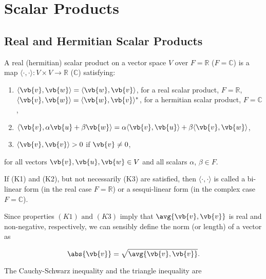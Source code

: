 \documentclass[a4paper,12pt]{report}
\begin{document}
\chapter{Scalar Products} \label{dot} 

\section{Real and Hermitian Scalar Products}

\begin{definition} \label{scalarproduct} 
    A real (hermitian) scalar product on a vector space \( V \) over \( F = \mathbb{R} \) (\( F = \mathbb{C} \)) is a map \(\langle \cdot, \cdot \rangle : V \times V \rightarrow \mathbb{R} \) (\( \mathbb{C} \)) satisfying:
    \begin{enumerate}[label=(\(K\)\arabic*)]
        \item \(\langle \vb{v}, \vb{w} \rangle = \langle \vb{w}, \vb{v} \rangle\), for a real scalar product, \( F = \mathbb{R} \),\\
              \(\langle \vb{v}, \vb{w} \rangle = \langle \vb{w}, \vb{v} \rangle^*\), for a hermitian scalar product, \( F = \mathbb{C} \),
        \item \(\langle \vb{v}, \alpha \vb{u} + \beta \vb{w} \rangle = \alpha \langle \vb{v}, \vb{u} \rangle + \beta \langle \vb{v}, \vb{w} \rangle\),
        \item \(\langle \vb{v}, \vb{v} \rangle > 0\) if \(\vb{v} \neq 0\),
    \end{enumerate}
    for all vectors \(\vb{v}, \vb{u}, \vb{w} \in V\) and all scalars \(\alpha\), \(\beta \in F\).
    
    If (K1) and (K2), but not necessarily (K3) are satisfied, then \(\langle \cdot, \cdot \rangle\) is called a bi-linear form (in the real case \( F = \mathbb{R} \)) or a sesqui-linear form (in the complex case \( F = \mathbb{C} \)).
\end{definition}

Since properties \((K1) \text { and } (K3)\) imply that \(\avg{\vb{v} ,\vb{v} } \) is real and non-negative, respectively, we can sensibly define the norm (or length) of a vector as 

\begin{equation}
    \abs{\vb{v} } = \sqrt{\avg{\vb{v} ,\vb{v} } }.
\end{equation}

The Cauchy-Schwarz inequality and the triangle inequality are 
\end{document}
